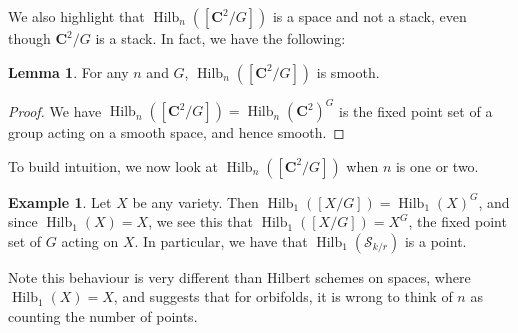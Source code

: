 \documentclass{amsart}[12pt]
\theoremstyle{definition}
\newtheorem{lemma}[dummy]{Lemma}
\newtheorem{example}[dummy]{Example}
\newcommand{\C}{\mathbf{C}}
\newcommand{\Sur}{\mathcal{S}}
\DeclareMathOperator{\Hilb}{Hilb}
\begin{document}
We also highlight that $\Hilb_n([\C^2/G])$ is a space and not a stack, even though $\C^2/G$ is a stack.  In fact, we have the following:

\begin{lemma} For any $n$ and $G$, $\Hilb_n([\C^2/G])$ is smooth.
\end{lemma}

\begin{proof}  
  We have $\Hilb_n([\C^2/G])=\Hilb_n(\C^2)^G$ is the fixed point set of a group acting on a smooth space, and hence smooth.
  \end{proof}

To build intuition, we now look at $\Hilb_n([\C^2/G])$ when $n$ is one or two.

\begin{example}
Let $X$ be any variety.  Then $\Hilb_1([X/G])=\Hilb_1(X)^G$, and since $\Hilb_1(X)=X$, we see this that $\Hilb_1([X/G])=X^G$, the fixed point set of $G$ acting on $X$.  In particular, we have that $\Hilb_1(\Sur_{k/r})$ is a point.
\end{example}

Note this behaviour is very different than Hilbert schemes on spaces, where $\Hilb_1(X)=X$, and suggests that for orbifolds, it is wrong to think of $n$ as counting the number of points.
\end{document}
